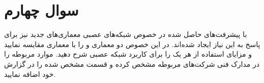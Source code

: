 \section{سوال چهارم}
با پیشرفت‌های حاصل شده در خصوص شبکه‌های عصبی معماری‌های  جدید نیز برای پاسخ به این نیاز ایجاد شده‌اند. در این خصوص دو معماری  و  را با معماری  مقایسه نمایید و مزایای استفاده از هر یک را برای کاربرد شبکه عصبی شرح دهید. موارد مربوطه را در مدارک فنی شرکت‌های مربوطه مشخص کرده و قسمت مشخص شده را در گزارش خود اضافه نمایید.


\begin{qsolve}

	
\end{qsolve}